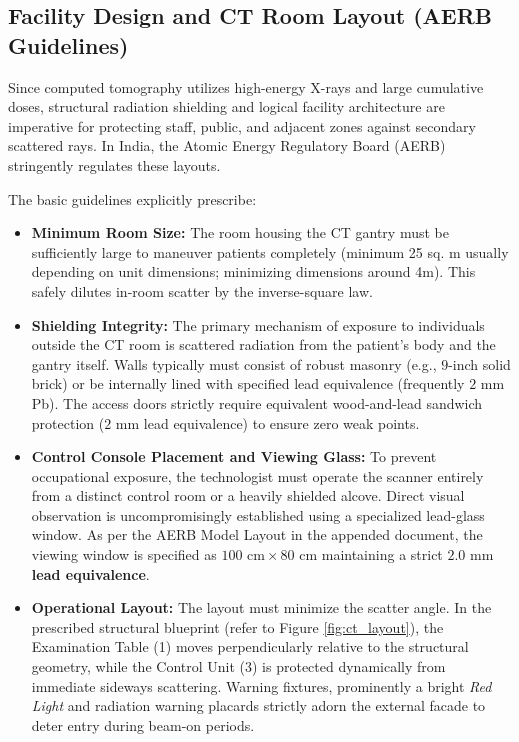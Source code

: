 \subsection{Facility Design and CT Room Layout (AERB Guidelines)}
Since computed tomography utilizes high-energy X-rays and large cumulative doses, structural radiation shielding and logical facility architecture are imperative for protecting staff, public, and adjacent zones against secondary scattered rays. In India, the Atomic Energy Regulatory Board (AERB) stringently regulates these layouts.

The basic guidelines explicitly prescribe:
\begin{itemize}
    \item \textbf{Minimum Room Size:} The room housing the CT gantry must be sufficiently large to maneuver patients completely (minimum 25 sq. m usually depending on unit dimensions; minimizing dimensions around 4m). This safely dilutes in-room scatter by the inverse-square law.
    \item \textbf{Shielding Integrity:} The primary mechanism of exposure to individuals outside the CT room is scattered radiation from the patient's body and the gantry itself. Walls typically must consist of robust masonry (e.g., $9$-inch solid brick) or be internally lined with specified lead equivalence (frequently $2\text{ mm}$ Pb). The access doors strictly require equivalent wood-and-lead sandwich protection ($2\text{ mm}$ lead equivalence) to ensure zero weak points.
    \item \textbf{Control Console Placement and Viewing Glass:} To prevent occupational exposure, the technologist must operate the scanner entirely from a distinct control room or a heavily shielded alcove. Direct visual observation is uncompromisingly established using a specialized lead-glass window. As per the AERB Model Layout in the appended document, the viewing window is specified as $100\text{ cm} \times 80\text{ cm}$ maintaining a strict \textbf{$2.0\text{ mm}$ lead equivalence}.
    \item \textbf{Operational Layout:} The layout must minimize the scatter angle. In the prescribed structural blueprint (refer to Figure \ref{fig:ct_layout}), the Examination Table (1) moves perpendicularly relative to the structural geometry, while the Control Unit (3) is protected dynamically from immediate sideways scattering. Warning fixtures, prominently a bright \textit{Red Light} and radiation warning placards strictly adorn the external facade to deter entry during beam-on periods.
\end{itemize}

